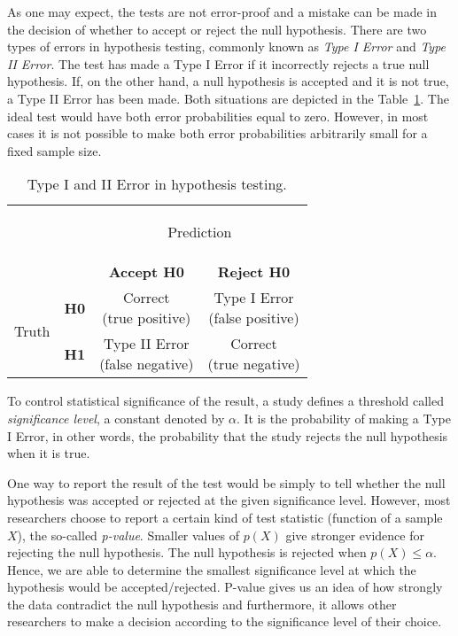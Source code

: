 As one may expect, the tests are not error-proof and a mistake can be made in the decision of whether to accept or reject the null hypothesis. There are two types of errors in hypothesis testing, commonly known as \textit{Type I Error} and \textit{Type II Error}. The test has made a Type I Error if it incorrectly rejects a true null hypothesis. If, on the other hand, a null hypothesis is accepted and it is not true, a Type II Error has been made. Both situations are depicted in the Table~\ref{tab:hypothesis_testing_errors}. The ideal test would have both error probabilities equal to zero. However, in most cases it is not possible to make both error probabilities arbitrarily small for a fixed sample size. \cite{casella}

\begin{table}[!htbp]
\centering
\renewcommand{\arraystretch}{2.5}
\begin{tabular}{l|l|c|c|}
\multicolumn{2}{c}{}&\multicolumn{2}{c}{\begin{Large}Prediction \end{Large}}\\
\cline{3-4}
\multicolumn{2}{c|}{}&\textbf{Accept H0}&\textbf{Reject H0}\\
\cline{2-4}
\multirow{2}{*}{\begin{Large}Truth\end{Large}}& \textbf{H0} & \shortstack{Correct\\(true positive)} & \shortstack{Type I Error\\(false positive)}\\
\cline{2-4}
& \textbf{H1} & \shortstack{Type II Error\\(false negative)} & \shortstack{Correct\\(true negative)} \\
\cline{2-4}
\end{tabular}
\caption{Type I and II Error in hypothesis testing.}\label{tab:hypothesis_testing_errors}
\end{table}

To control statistical significance of the result, a study defines a threshold called \textit{significance level}, a constant denoted by $\alpha$. It is the probability  of making a Type I Error, in other words, the probability that the study rejects the null hypothesis when it is true.

One way to report the result of the test would be simply to tell whether the null hypothesis was accepted or rejected at the given significance level. However, most researchers choose to report a certain kind of test statistic (function of a sample $X$), the so-called \textit{p-value}.
Smaller values of $p(X)$ give stronger evidence for rejecting the null hypothesis. The null hypothesis is rejected when $p(X) \leq \alpha$. Hence, we are able to determine the smallest significance level at which the hypothesis would be accepted/rejected. P-value gives us an idea of how strongly the data contradict the null hypothesis and furthermore, it allows other researchers to make a decision according to the significance level of their choice. \cite{sham_purcell, casella, lehmann}

